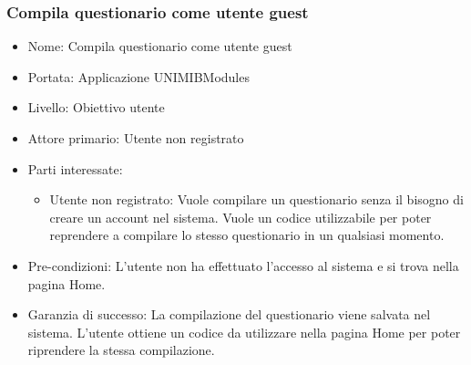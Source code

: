 \documentclass[12pt]{article}
\begin{document}
\subsubsection{Compila questionario come utente guest}
\begin{itemize}
	\item Nome: Compila questionario come utente guest
\end{itemize}
\begin{itemize}
	\item Portata: Applicazione UNIMIBModules
\end{itemize}
\begin{itemize}
\item Livello: Obiettivo utente
\end{itemize}
\begin{itemize}
\item Attore primario: Utente non registrato
\end{itemize}
\begin{itemize}
\item Parti interessate:
\begin{itemize}
	\item Utente non registrato: Vuole compilare un questionario senza il bisogno di creare un account nel sistema. Vuole 
un codice utilizzabile per poter reprendere a compilare lo stesso questionario in un qualsiasi momento.
\end{itemize}
\end{itemize}
\begin{itemize}
\item Pre-condizioni: L'utente non ha effettuato l'accesso al sistema e si trova nella pagina Home.
\end{itemize}
\begin{itemize}
\item Garanzia di successo: La compilazione del questionario viene salvata nel sistema. L'utente ottiene un codice da utilizzare 
nella pagina Home per poter riprendere la stessa compilazione.
\end{itemize}
\end{document}
